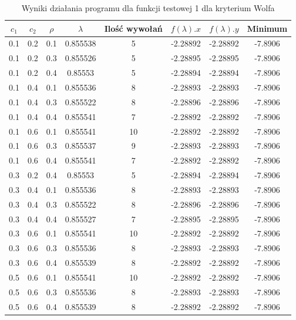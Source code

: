 \documentclass{classrep}
\begin{document}
\begin{table}
  \centering
  \caption{Wyniki działania programu dla funkcji testowej 1 dla kryterium Wolfa}
  \label{wolf1}
  \begin{tabular}{|c|c|c|c|c|c|c|c|}
    \hline
    $c_1$ & $c_2$ & $\rho$ & $\lambda$ & Ilość wywołań & $f(\lambda).x$ & $f(\lambda).y$ & Minimum \\
    \hline
    0.1 & 0.2 & 0.1 & 0.855538 & 5 & -2.28892 & -2.28892 & -7.8906 \\
    0.1 & 0.2 & 0.3 & 0.855526 & 5 & -2.28895 & -2.28895 & -7.8906 \\
    0.1 & 0.2 & 0.4 & 0.85553 & 5 & -2.28894 & -2.28894 & -7.8906 \\
    0.1 & 0.4 & 0.1 & 0.855536 & 8 & -2.28893 & -2.28893 & -7.8906 \\
    0.1 & 0.4 & 0.3 & 0.855522 & 8 & -2.28896 & -2.28896 & -7.8906 \\
    0.1 & 0.4 & 0.4 & 0.855541 & 7 & -2.28892 & -2.28892 & -7.8906 \\
    0.1 & 0.6 & 0.1 & 0.855541 & 10 & -2.28892 & -2.28892 & -7.8906 \\
    0.1 & 0.6 & 0.3 & 0.855537 & 9 & -2.28893 & -2.28893 & -7.8906 \\
    0.1 & 0.6 & 0.4 & 0.855541 & 7 & -2.28892 & -2.28892 & -7.8906 \\
    0.3 & 0.2 & 0.4 & 0.85553 & 5 & -2.28894 & -2.28894 & -7.8906 \\
    0.3 & 0.4 & 0.1 & 0.855536 & 8 & -2.28893 & -2.28893 & -7.8906 \\
    0.3 & 0.4 & 0.3 & 0.855522 & 8 & -2.28896 & -2.28896 & -7.8906 \\
    0.3 & 0.4 & 0.4 & 0.855527 & 7 & -2.28895 & -2.28895 & -7.8906 \\
    0.3 & 0.6 & 0.1 & 0.855541 & 10 & -2.28892 & -2.28892 & -7.8906 \\
    0.3 & 0.6 & 0.3 & 0.855536 & 8 & -2.28893 & -2.28893 & -7.8906 \\
    0.3 & 0.6 & 0.4 & 0.855539 & 8 & -2.28892 & -2.28892 & -7.8906 \\
    0.5 & 0.6 & 0.1 & 0.855541 & 10 & -2.28892 & -2.28892 & -7.8906 \\
    0.5 & 0.6 & 0.3 & 0.855536 & 8 & -2.28893 & -2.28893 & -7.8906 \\
    0.5 & 0.6 & 0.4 & 0.855539 & 8 & -2.28892 & -2.28892 & -7.8906 \\
    \hline
  \end{tabular}
\end{table}
\end{document}
